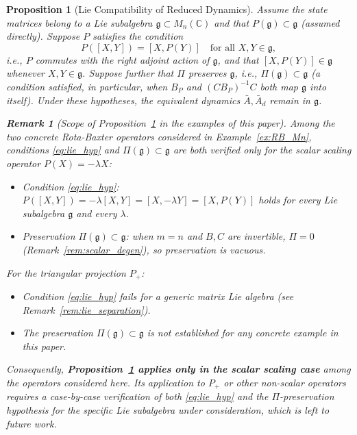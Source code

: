 \documentclass[10pt]{amsart}
\numberwithin{equation}{section}
\newtheorem{proposition}[theorem]{Proposition}
\newtheorem{remark}[theorem]{Remark}
\begin{document}
\begin{proposition}[Lie Compatibility of Reduced Dynamics]\label{prop:lie_compat}
Assume the state matrices belong to a Lie subalgebra
\(\mathfrak{g} \subset M_n(\mathbb{C})\) and that $P(\mathfrak{g}) \subset \mathfrak{g}$
(assumed directly). Suppose $P$ satisfies the condition
\begin{equation}\label{eq:lie_hyp}
P([X,Y]) = [X, P(Y)] \quad \text{for all } X, Y \in \mathfrak{g},
\end{equation}
i.e., $P$ commutes with the right adjoint action of $\mathfrak{g}$, and that
$[X,P(Y)] \in \mathfrak{g}$ whenever $X,Y \in \mathfrak{g}$. Suppose further that
$\Pi$ preserves $\mathfrak{g}$, i.e., $\Pi(\mathfrak{g}) \subset \mathfrak{g}$ (a
condition satisfied, in particular, when $B_P$ and $(CB_P)^{-1}C$ both map
$\mathfrak{g}$ into itself). Under these hypotheses, the equivalent dynamics
$\bar{A}, \bar{A}_d$ remain in $\mathfrak{g}$.

\begin{remark}[Scope of Proposition~\ref{prop:lie_compat} in the examples of this paper]
\label{rem:lie_scope}
Among the two concrete Rota-Baxter operators considered in Example~\ref{ex:RB_Mn},
conditions \eqref{eq:lie_hyp} and $\Pi(\mathfrak{g}) \subset \mathfrak{g}$ are both
verified \emph{only} for the scalar scaling operator $P(X) = -\lambda X$:
\begin{itemize}
  \item Condition \eqref{eq:lie_hyp}: $P([X,Y]) = -\lambda[X,Y] = [X,-\lambda Y] = [X,P(Y)]$
        holds for every Lie subalgebra $\mathfrak{g}$ and every $\lambda$.
  \item Preservation $\Pi(\mathfrak{g}) \subset \mathfrak{g}$: when $m=n$ and $B, C$
        are invertible, $\Pi = 0$ (Remark~\ref{rem:scalar_degen}), so preservation is
        vacuous.
\end{itemize}
For the triangular projection $P_+$:
\begin{itemize}
  \item Condition \eqref{eq:lie_hyp} \emph{fails} for a generic matrix Lie algebra
        (see Remark~\ref{rem:lie_separation}).
  \item The preservation $\Pi(\mathfrak{g}) \subset \mathfrak{g}$ is not established
        for any concrete example in this paper.
\end{itemize}
Consequently, \textbf{Proposition~\ref{prop:lie_compat} applies only in the scalar
scaling case} among the operators considered here. Its application to $P_+$ or other
non-scalar operators requires a case-by-case verification of both \eqref{eq:lie_hyp}
and the $\Pi$-preservation hypothesis for the specific Lie subalgebra under
consideration, which is left to future work.
\end{remark}
\end{proposition}
\end{document}

